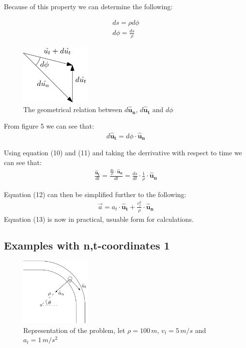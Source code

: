 \documentclass[11pt, a4paper]{article}
\begin{document}
Because of this property we can determine the following:

\begin{gather}
    ds = \rho d\phi\\
    d\phi = \frac{ds}{\rho}
\end{gather}

\begin{figure}[h]
    \centerline{\includegraphics[width=3.5cm]{images/Differential element_2.png}}
    \caption{The geometrical relation between $d\boldsymbol{{\hat{u}_n}}$, $d\boldsymbol{{\hat{u}_t}}$ and $d\phi$}
\end{figure}
From figure 5 we can see that:
\begin{gather}
    d\boldsymbol{\hat{u}_t} = d\phi \cdot \boldsymbol{\hat{u}_n}
\end{gather}

Using equation (10) and (11) and taking the derrivative with respect to time we can see that:
\begin{gather}
    \frac{\boldsymbol{\hat{u}_t}}{dt} = \frac{\frac{ds}{\rho} \cdot \boldsymbol{\hat{u}_n}}{dt} =
        \frac{ds}{dt} \cdot \frac{1}{\rho} \cdot \boldsymbol{\hat{u}_n}
\end{gather}

Equation (12) can then be simplified further to the following:
\begin{gather}
    \vec{a} = a_t \cdot \boldsymbol{\hat{u}_t} + \frac{v_t^2}{\rho}\cdot \boldsymbol{\hat{u}_n}
\end{gather}
Equation (13) is now in practical, usuable form for calculations.

\newpage
\subsection{Examples with n,t-coordinates 1}
\begin{figure}[h]
    \centerline{\includegraphics[width=3.5cm]{images/NT_example_2.png}}
    \caption{Representation of the problem, let $\rho=100\,m$, $v_t=5\,m/s$ and $a_t=1\,m/s^2$}
\end{figure}
\end{document}
